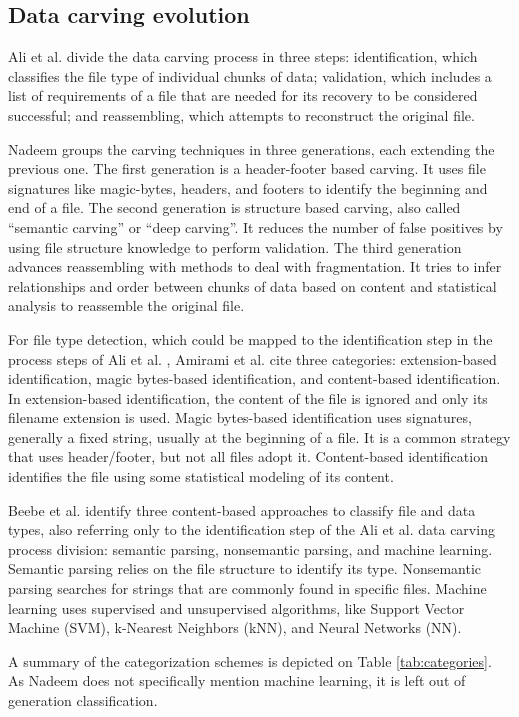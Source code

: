 \subsection{Data carving evolution}
Ali et al. \cite{ali_review_2018} divide the data carving process in three steps:
    identification, which classifies the file type of individual chunks of data; 
    validation, which includes a list of requirements of a file that are needed for its recovery to be considered successful; and
    reassembling, which attempts to reconstruct the original file.

Nadeem \cite{nadeem_ashraf_forensic_2013} groups the carving techniques in three generations, each extending the previous one.
The first generation is a header-footer based carving. It uses file signatures like magic-bytes, headers, and footers to identify the beginning and end of a file.
The second generation is structure based carving, also called ``semantic carving'' or ``deep carving''. It reduces the number of false positives by using file structure knowledge to perform validation.
The third generation advances reassembling with methods to deal with fragmentation. It tries to infer relationships and order between chunks of data based on content and statistical analysis to reassemble the original file.

For file type detection, which could be mapped to the identification step in the  process steps of Ali et al. \cite{ali_review_2018}, Amirami et al. \cite{amirani_new_2008} cite three categories: extension-based identification, magic bytes-based identification, and content-based identification.
In extension-based identification, the content of the file is ignored and only its filename extension is used. Magic bytes-based identification uses signatures, generally a fixed string, usually at the beginning of a file. It is a common strategy that uses header/footer, but not all files adopt it. Content-based identification identifies the file using some statistical modeling of its content.

Beebe et al. \cite{beebe_sceadan:_2013} identify three content-based approaches to classify file and data types, also referring only to the identification step of the Ali et al. \cite{ali_review_2018} data carving process division: semantic parsing, nonsemantic parsing, and machine learning. Semantic parsing relies on the file structure to identify its type. Nonsemantic parsing searches for strings that are commonly found in specific files. Machine learning uses supervised and unsupervised algorithms, like Support Vector Machine (SVM), k-Nearest Neighbors (kNN), and Neural Networks (NN).


A summary of the categorization schemes is depicted on Table \ref{tab:categories}. As Nadeem \cite{nadeem_ashraf_forensic_2013} does not specifically mention machine learning, it is left out of generation classification.


